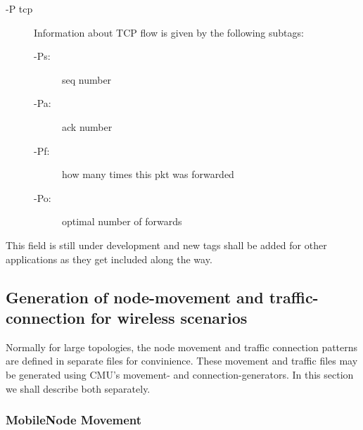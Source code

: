 \begin{description}
\begin{description}
\item[-P tcp] Information about TCP flow is given by the following
subtags:

\begin{description}
\item[-Ps:] seq number
\item[-Pa:] ack number
\item[-Pf:] how many times this pkt was forwarded
\item[-Po:] optimal number of forwards 
\end{description}
\end{description}

This field is still under development and new tags shall be added for
other applications as they get included along the way.
\end{description}


\subsection{Generation of node-movement and traffic-connection for
  wireless scenarios}
\label{sec:mobile-scen-generator}

Normally for large topologies, the node movement and traffic connection
patterns are defined in separate files for convinience. These movement and
traffic files may be generated using CMU's movement- and
connection-generators. In this section we shall describe both separately.

\subsubsection{MobileNode Movement}
\label{sec:mobile-movement-file}

